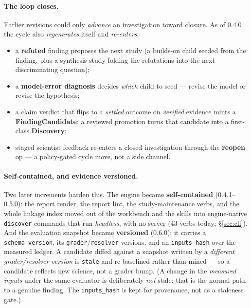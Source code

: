\documentclass[11pt]{article}
\newcommand{\code}[1]{\texttt{\small #1}}
\begin{document}
\paragraph{The loop closes.} Earlier revisions could only \emph{advance} an investigation
toward closure. As of 0.4.0 the cycle also \emph{regenerates} itself and \emph{re-enters}:

\begin{itemize}
\item a \textbf{refuted} finding proposes the next study (a builds-on child seeded from the
finding, plus a synthesis study folding the refutations into the next discriminating question);
\item a \textbf{model-error diagnosis} decides \emph{which} child to seed --- revise the model
or revise the hypothesis;
\item a claim verdict that flips to a \emph{settled} outcome on \emph{verified} evidence mints a
\textbf{FindingCandidate}; a reviewed promotion turns that candidate into a first-class
\textbf{Discovery};
\item staged scientist feedback re-enters a closed investigation through the \textbf{reopen}
op --- a policy-gated cycle move, not a side channel.
\end{itemize}

\paragraph{Self-contained, and evidence versioned.} Two later increments harden this. The engine
became \textbf{self-contained} (0.4.1--0.5.0): the report render, the report lint, the
study-maintenance verbs, and the whole linkage index moved out of the workbench and the skills into
engine-native \code{discover} commands that run \emph{headless}, with no server (43 verbs today;
\S\ref{sec:cli}). And the evaluation snapshot became \textbf{versioned} (0.6.0): it carries a
\code{schema\_version}, its \code{grader}/\code{resolver} versions, and an \code{inputs\_hash} over
the measured ledger. A candidate diffed against a snapshot written by a \emph{different
grader/resolver version} is \code{stale} and re-baselined rather than mined --- so a candidate
reflects new science, not a grader bump. (A change in the \emph{measured inputs} under the same
evaluator is deliberately \emph{not} stale: that is the normal path to a genuine finding. The
\code{inputs\_hash} is kept for provenance, not as a staleness gate.)
\end{document}
